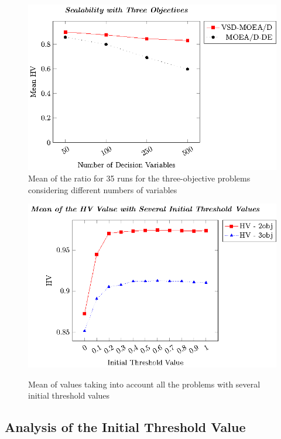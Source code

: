 \begin{figure}[t]
\centering
\includegraphics[scale=0.85]{images/Graphic-Scalability-3obj_tikz-figure0.eps}
\caption{Mean of the \HV{} ratio for 35 runs for the three-objective problems considering different numbers of variables} \label{fig:scalability-3obj}
\end{figure}


\begin{figure}[t]
\centering
\includegraphics[scale=0.85]{images/Graphic-Initial-Distance_tikz-figure0.eps} \\
\caption{Mean of \HV{} values taking into account all the problems with several initial threshold values}\label{fig:Initial-distance-factor}
\end{figure}


\subsection{Analysis of the Initial Threshold Value}

